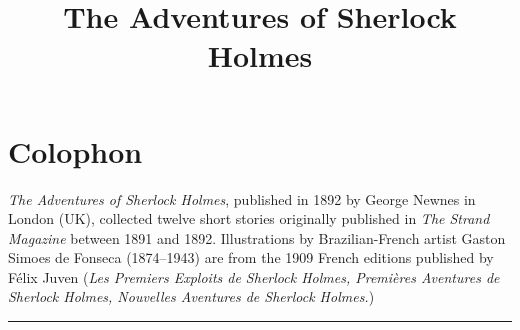\documentclass[
a5paper,
]{scrbook} %
\title{The Adventures of Sherlock Holmes}
\renewcommand{\thesection}{\arabic{section}}
\begin{document}

\frontmatter

  \begin{titlepage}
   
  \end{titlepage}







\cleardoubleoddpage

\tableofcontents
\thispagestyle{empty}
\clearpage
\vfill


\mainmatter
\pagestyle{headings}
\renewcommand*{\chapterpagestyle}{plain}



\rohead{\leftmark: Chapter \thesection}



\rohead{\leftmark}














\chapter*{Colophon}

\centering
\textit{The Adventures of Sherlock Holmes}, published in 1892 by George Newnes in London (UK), collected twelve short stories originally published in \textit{The Strand Magazine} between 1891 and 1892. Illustrations by Brazilian-French artist Gaston Simoes de Fonseca (1874--1943) are from the 1909 French editions published by Félix Juven (\textit{Les Premiers Exploits de Sherlock Holmes, Premières Aventures de Sherlock Holmes, Nouvelles Aventures de Sherlock Holmes.}) 
\vfill
\rule{0.5\textwidth}{.4pt}
\vfill
\end{document}
